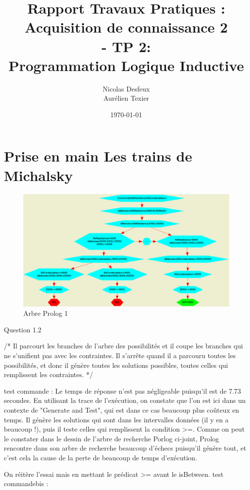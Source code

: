 \documentclass[11pt]{article} %
\date{\today}
\title{Rapport Travaux Pratiques : \\Acquisition de connaissance 2\\ - TP 2: \\Programmation Logique Inductive}
\author{Nicolas Desfeux\\Aurélien Texier}
\begin{document}
\lstset{language=Prolog,breaklines=true,numbers=left,basicstyle=\footnotesize ,numberstyle=\footnotesize}
\maketitle
\tableofcontents
\newpage
\section{Prise en main  Les trains de Michalsky}
\begin{figure}
\includegraphics[width=15cm]{tp1.png}
\caption{Arbre Prolog 1}
\end{figure}


Question 1.2

/* Il parcourt les branches de l'arbre des possibilités et il coupe les branches qui ne
s'unifient pas avec les contraintes.
Il s'arrête quand il a parcouru toutes les possibilités, et donc il génère toutes les solutions possibles,
toutes celles qui remplissent les contraintes.
*/

test commande : 
Le temps de réponse n'est pas négligeable puisqu'il est de 7.73 secondes.
En utilisant la trace de l'exécution, on constate que l'on est ici dans un contexte de "Generate and Test",
qui est dans ce cas beaucoup plus coûteux en temps.
Il génère les solutions qui sont dans les intervalles données (il y en a beaucoup !),
puis il teste celles qui remplissent la condition >=.
Comme on peut le constater dans le dessin de l'arbre de recherche Porlog ci-joint, Prolog rencontre
dans son arbre de recherche beaucoup d'échecs puisqu'il génère tout, et c'est cela la cause de la perte de
beaucoup de temps d'exécution.


 On réitère l'essai mais en mettant le prédicat >= avant le isBetween.
test commandebis : 
\end{document}

